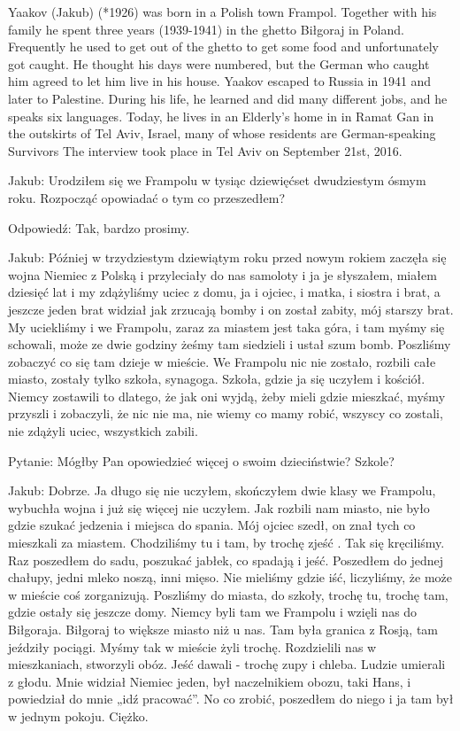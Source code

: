 Yaakov (Jakub) (*1926) was born in a Polish town Frampol. Together with his family he spent three years (1939-1941) in the ghetto Biłgoraj in Poland. Frequently he used to get out of the ghetto to get some food and unfortunately got caught. He thought his days were numbered, but the German who caught him agreed to let him live in his house. Yaakov escaped to Russia in 1941 and later to Palestine. During his life, he learned and did many different jobs, and he speaks six languages. Today, he lives in an Elderly’s home in in Ramat Gan in the outskirts of Tel Aviv, Israel, many of whose residents are German-speaking Survivors The interview took place in Tel Aviv on September 21st, 2016. 

Jakub:  Urodziłem się we Frampolu w tysiąc dziewięćset dwudziestym ósmym roku. Rozpocząć opowiadać o tym co przeszedłem? 

Odpowiedź: Tak, bardzo prosimy. 

Jakub: Później w trzydziestym dziewiątym roku przed nowym rokiem zaczęła się wojna Niemiec          z Polską i przyleciały do nas samoloty i ja je słyszałem, miałem dziesięć lat i my zdążyliśmy uciec             z domu, ja i ojciec, i matka, i siostra i brat,  a jeszcze jeden brat widział jak zrzucają  bomby i on został zabity, mój starszy brat. My uciekliśmy i we Frampolu, zaraz za miastem jest taka góra, i tam myśmy się schowali, może ze dwie godziny żeśmy tam siedzieli i ustał szum bomb. Poszliśmy zobaczyć co się tam dzieje w mieście. We Frampolu nic nie zostało, rozbili całe miasto, zostały tylko szkoła, synagoga. Szkoła, gdzie ja się uczyłem i kościół. Niemcy zostawili to dlatego, że jak oni wyjdą, żeby mieli gdzie mieszkać,  myśmy przyszli i zobaczyli, że nic nie ma, nie wiemy co mamy robić, wszyscy co zostali,    nie zdążyli uciec, wszystkich zabili.  

Pytanie: Mógłby Pan opowiedzieć więcej o swoim dzieciństwie? Szkole? 

Jakub: Dobrze. Ja długo się nie uczyłem, skończyłem dwie klasy we Frampolu, wybuchła wojna i już się więcej nie uczyłem. Jak rozbili nam miasto, nie było gdzie szukać jedzenia i miejsca do spania. Mój ojciec szedł, on znał tych co mieszkali za miastem. Chodziliśmy tu i tam, by trochę zjeść . Tak się kręciliśmy. Raz poszedłem do sadu, poszukać jabłek, co spadają i jeść. Poszedłem do jednej chałupy,  jedni mleko noszą, inni mięso. Nie mieliśmy gdzie iść, liczyliśmy, że może w mieście coś zorganizują. Poszliśmy do miasta, do szkoły, trochę tu, trochę tam, gdzie ostały się jeszcze domy. Niemcy byli tam we Frampolu i wzięli nas do Biłgoraja. Biłgoraj to większe miasto niż u nas.  Tam była granica z Rosją, tam jeździły pociągi. Myśmy tak w mieście żyli trochę. Rozdzielili nas w mieszkaniach, stworzyli obóz. Jeść dawali - trochę zupy i chleba. Ludzie umierali z głodu. Mnie widział Niemiec jeden,                       był naczelnikiem obozu, taki Hans, i powiedział do mnie „idź pracować”. No co zrobić, poszedłem do niego i ja tam był w jednym pokoju. Ciężko. 

